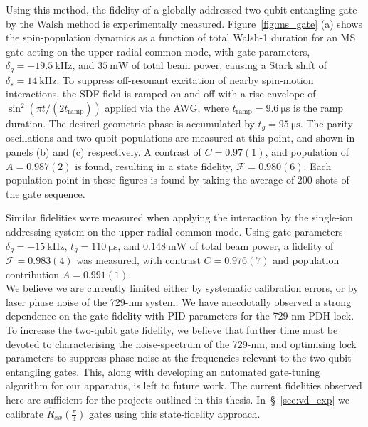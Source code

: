     Using this method, the fidelity of a globally addressed two-qubit entangling
    gate by the Walsh method is experimentally measured.
    Figure~\ref{fig:ms_gate} (a) shows the spin-population dynamics as a
    function of total Walsh-1 duration for an MS gate acting on the upper radial
    common mode, with gate parameters, $\delta_g = -19.5~\unit{\kilo\hertz}$, and
    $35~\unit{\milli\watt}$ of total beam power, causing a Stark shift of
    $\delta_s=14~\unit{\kilo\hertz}$. To suppress off-resonant excitation of
    nearby spin-motion interactions, the SDF field is ramped on and off with a
    rise envelope of $\sin^2(\pi t/(2t_\mathrm{ramp}))$ applied via the AWG, where
    $t_\mathrm{ramp}=9.6~\unit{\micro\second}$ is the ramp duration. The desired
    geometric phase is accumulated by $t_g=95~\unit{\micro\second}$. The parity
    oscillations and two-qubit populations are measured at this point, and shown
    in panels (b) and (c) respectively. A contrast of $C=0.97(1)$, and
    population of $A=0.987(2)$ is found, resulting in a state fidelity,
    $\mathcal{F}=0.980(6)$.
    Each population point in these figures is found by taking the
    average of 200 shots of the gate sequence.

    Similar fidelities were measured when applying the interaction by the single-ion addressing system on
    the upper radial common mode. Using
    gate parameters $\delta_g = -15~\unit{\kilo\hertz}$, $t_g=110~\unit{\micro\second}$, and
    $0.148~\unit{\milli\watt}$ of total beam power,
    a fidelity of
    $\mathcal{F}=0.983(4)$ was measured, with contrast $C=0.976(7)$ and
    population contribution $A=0.991(1)$.\\

    We believe we are currently limited either by systematic calibration errors,
    or by laser phase noise of the 729-nm system. We have anecdotally observed a
    strong dependence on the gate-fidelity with PID parameters for the 729-nm
    PDH lock. To increase the two-qubit gate fidelity, we believe that further time
    must be devoted to characterising the noise-spectrum of the 729-nm, and
    optimising lock parameters to suppress phase noise at the frequencies
    relevant to the two-qubit entangling gates. This, along with developing an
    automated gate-tuning algorithm for our apparatus, is left to future work.
    The current fidelities observed here are sufficient for the projects outlined in this
    thesis. In~\S~\ref{sec:vd_exp} we calibrate $\hat R_{xx}(\frac{\pi}{4})$ gates
    using this state-fidelity approach.

